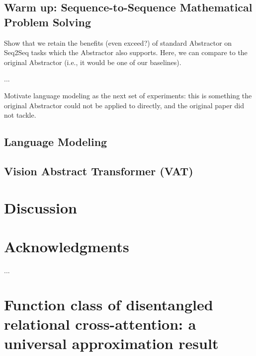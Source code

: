 \documentclass{article}
\begin{document}

\subsection{Warm up: Sequence-to-Sequence Mathematical Problem Solving}

Show that we retain the benefits (even exceed?) of standard Abstractor on Seq2Seq tasks which the Abstractor also supports. Here, we can compare to the original Abstractor (i.e., it would be one of our baselines).

...

Motivate language modeling as the next set of experiments: this is something the original Abstractor could not be applied to directly, and the original paper did not tackle.

\subsection{Language Modeling}

\subsection{Vision Abstract Transformer (VAT)}

\section{Discussion}

\section*{Acknowledgments}
...

\printbibliography


\listoffixmes

\clearpage
\newpage


\appendix

\section{Function class of disentangled relational cross-attention: a universal approximation result}
\end{document}
